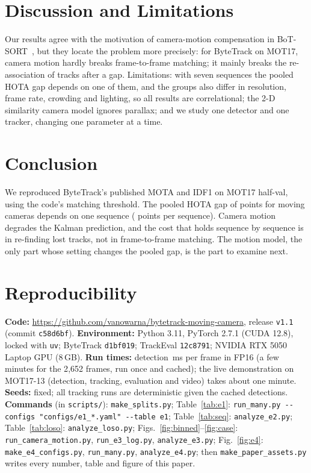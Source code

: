 \documentclass[conference]{IEEEtran}
\newcommand{\repocommit}{c58d6bf}
\begin{document}
\section{Discussion and Limitations}
Our results agree with the motivation of camera-motion compensation in BoT-SORT~\cite{aharon2022botsort}, but they
locate the problem more precisely: for ByteTrack on MOT17, camera motion hardly breaks frame-to-frame matching; it
mainly breaks the re-association of tracks after a gap. Limitations: with seven sequences the pooled HOTA gap depends on one of them, and the groups also differ in
resolution, frame rate, crowding and lighting, so all results are correlational; the 2-D similarity camera model ignores
parallax; and we study one detector and one tracker, changing one parameter at a time.

\section{Conclusion}
We reproduced ByteTrack's published MOTA and IDF1 on MOT17 half-val, using the code's matching threshold. The pooled
HOTA gap of \vGapHOTA{} points for moving cameras depends on one sequence (\vSeqMeanGap{} points per sequence). Camera
motion degrades the Kalman prediction, and the cost that holds sequence by sequence is in re-finding lost tracks, not in
frame-to-frame matching. The motion model, the only part whose setting changes the pooled gap, is the part to examine next.

\FloatBarrier



\appendices
\section{Reproducibility}
{\footnotesize\raggedright
\textbf{Code:} \url{https://github.com/vanowarna/bytetrack-moving-camera}, release \texttt{v1.1} (commit \texttt{\repocommit}).
\textbf{Environment:} Python 3.11, PyTorch 2.7.1 (CUDA 12.8), locked with \texttt{uv}; ByteTrack \texttt{d1bf019};
TrackEval \texttt{12c8791}; NVIDIA RTX 5050 Laptop GPU (8\,GB).
\textbf{Run times:} detection \vDetMsFP{}\,ms per frame in FP16 (a few minutes for the 2{,}652 frames, run once and
cached); the live demonstration on MOT17-13 (detection, tracking, evaluation and video) takes about one minute.
\textbf{Seeds:} fixed; all tracking runs are deterministic given the cached detections.
\textbf{Commands} (in \texttt{scripts/}): \texttt{make\_splits.py}; Table~\ref{tab:e1}: \texttt{run\_many.py -{}-configs "configs/e1\_*.yaml" -{}-table e1};
Table~\ref{tab:seq}: \texttt{analyze\_e2.py}; Table~\ref{tab:loso}: \texttt{analyze\_loso.py};
Figs.~\ref{fig:binned}--\ref{fig:case}: \texttt{run\_camera\_motion.py}, \texttt{run\_e3\_log.py}, \texttt{analyze\_e3.py};
Fig.~\ref{fig:e4}: \texttt{make\_e4\_configs.py}, \texttt{run\_many.py}, \texttt{analyze\_e4.py};
then \texttt{make\_paper\_assets.py} writes every number, table and figure of this paper.\par}

\end{document}
